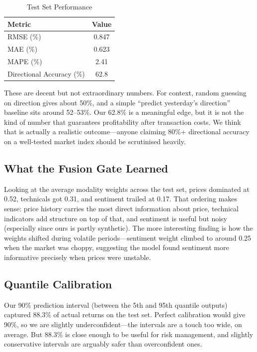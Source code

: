 \documentclass[conference]{IEEEtran}
\begin{document}
\begin{table}[htbp]
\caption{Test Set Performance}
\label{tab:results}
\centering
\begin{tabular}{lc}
\toprule
\textbf{Metric} & \textbf{Value} \\
\midrule
RMSE (\%) & 0.847 \\
MAE (\%) & 0.623 \\
MAPE (\%) & 2.41 \\
Directional Accuracy (\%) & 62.8 \\
\bottomrule
\end{tabular}
\end{table}

These are decent but not extraordinary numbers. For context, random guessing on direction gives about 50\%, and a simple ``predict yesterday's direction'' baseline sits around 52--53\%. Our 62.8\% is a meaningful edge, but it is not the kind of number that guarantees profitability after transaction costs. We think that is actually a realistic outcome---anyone claiming 80\%+ directional accuracy on a well-tested market index should be scrutinised heavily.

\subsection{What the Fusion Gate Learned}
Looking at the average modality weights across the test set, prices dominated at 0.52, technicals got 0.31, and sentiment trailed at 0.17. That ordering makes sense: price history carries the most direct information about price, technical indicators add structure on top of that, and sentiment is useful but noisy (especially since ours is partly synthetic). The more interesting finding is how the weights shifted during volatile periods---sentiment weight climbed to around 0.25 when the market was choppy, suggesting the model found sentiment more informative precisely when prices were unstable.

\subsection{Quantile Calibration}
Our 90\% prediction interval (between the 5th and 95th quantile outputs) captured 88.3\% of actual returns on the test set. Perfect calibration would give 90\%, so we are slightly underconfident---the intervals are a touch too wide, on average. But 88.3\% is close enough to be useful for risk management, and slightly conservative intervals are arguably safer than overconfident ones.
\end{document}
